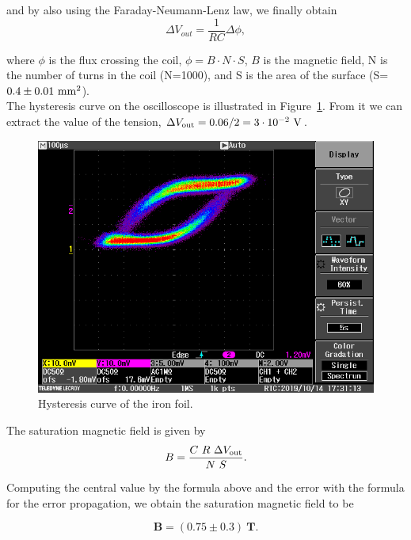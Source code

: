 \documentclass[10pt,swedish, openany]{book}
\begin{document}
and by also using the Faraday-Neumann-Lenz law, we finally obtain
\begin{equation}
    \Delta V_{out}= \frac{1}{R C} \Delta \phi, 
\end{equation}

where $\phi$ is the flux crossing the coil, $\phi = B \cdot N \cdot S$, $B$ is the magnetic field, N is the number of turns in the coil (N=1000), and S is the area of the surface (S=$ 0.4 \pm 0.01\  {\rm mm}^2$). \\

The hysteresis curve on the oscilloscope is illustrated in Figure~\ref{fig:curve}. From it we can extract the value of the tension, $\Delta V_{\rm out} = 0.06/2 = 3 \cdot 10^{-2}\  {\rm V}$.

\begin{figure}[H]
\includegraphics[scale=0.3]{SCRN0004.PNG}
\centering
\caption{Hysteresis curve of the iron foil.}
\label{fig:curve}
\end{figure}

The saturation magnetic field is given by
\begin{equation}
    B = \frac{C \ R \ \Delta V_{\rm out}}{N \ S}.
\end{equation}

Computing the central value by the formula above and the error with the formula for the error propagation, we obtain the saturation magnetic field to be 

\begin{equation*}
    \mathbf{B = (0.75 \pm 0.3)\ T}.
\end{equation*}
\end{document}
